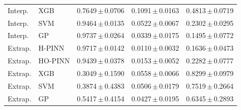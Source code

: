 \begin{table}[!htbp]
\begin{tabular}{llccc}
Interp. & XGB & 0.7649\,$\pm$\,0.0706 & 0.1091\,$\pm$\,0.0163 & 0.4813\,$\pm$\,0.0719 \\
Interp. & SVM & 0.9464\,$\pm$\,0.0135 & 0.0522\,$\pm$\,0.0067 & 0.2302\,$\pm$\,0.0295 \\
Interp. & GP & 0.9737\,$\pm$\,0.0264 & 0.0339\,$\pm$\,0.0175 & 0.1495\,$\pm$\,0.0772 \\
\midrule
Extrap. & H-PINN & 0.9717\,$\pm$\,0.0142 & 0.0110\,$\pm$\,0.0032 & 0.1636\,$\pm$\,0.0473 \\
Extrap. & HO-PINN & 0.9439\,$\pm$\,0.0378 & 0.0153\,$\pm$\,0.0052 & 0.2282\,$\pm$\,0.0777 \\
Extrap. & XGB & 0.3049\,$\pm$\,0.1590 & 0.0558\,$\pm$\,0.0066 & 0.8299\,$\pm$\,0.0979 \\
Extrap. & SVM & 0.3874\,$\pm$\,0.4383 & 0.0506\,$\pm$\,0.0179 & 0.7519\,$\pm$\,0.2664 \\
Extrap. & GP & 0.5417\,$\pm$\,0.4154 & 0.0427\,$\pm$\,0.0195 & 0.6345\,$\pm$\,0.2893 \\
\bottomrule
\end{tabular}
\end{table}
